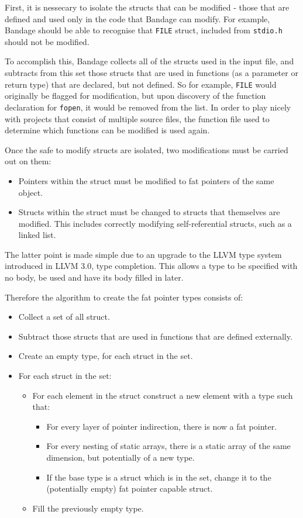 First, it is nessecary to isolate the structs that can be modified - those that are defined and used only in the code that Bandage can modify.
For example, Bandage should be able to recognise that \verb!FILE! struct, included from \verb!stdio.h! should not be modified.

To accomplish this, Bandage collects all of the structs used in the input file, and subtracts from this set those structs that are used in functions (as a parameter or return type) that are declared, but not defined.
So for example, \verb!FILE! would originally be flagged for modification, but upon discovery of the function declaration for \verb!fopen!, it would be removed from the list.
In order to play nicely with projects that consist of multiple source files, the function file used to determine which functions can be modified is used again.

Once the safe to modify structs are isolated, two modifications must be carried out on them:

\begin{itemize}
\item Pointers within the struct must be modified to fat pointers of the same object.
\item Structs within the struct must be changed to structs that themselves are modified.
This includes correctly modifying self-referential structs, such as a linked list.
\end{itemize}

The latter point is made simple due to an upgrade to the LLVM type system introduced in LLVM 3.0, type completion.
This allows a type to be specified with no body, be used and have its body filled in later.

Therefore the algorithm to create the fat pointer types consists of:

\begin{itemize}
\item Collect a set of all struct.
\item Subtract those structs that are used in functions that are defined externally.
\item Create an empty type, for each struct in the set.
\item For each struct in the set:
\begin{itemize}
\item For each element in the struct construct a new element with a type such that:
\begin{itemize}
\item For every layer of pointer indirection, there is now a fat pointer.
\item For every nesting of static arrays, there is a static array of the same dimension, but potentially of a new type.
\item If the base type is a struct which is in the set, change it to the (potentially empty) fat pointer capable struct.
\end{itemize}
\item Fill the previously empty type.
\end{itemize}
\end{itemize}

